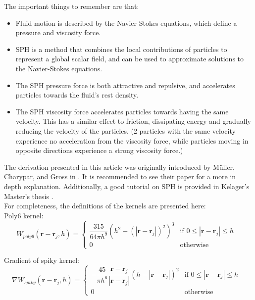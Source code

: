 \documentclass[]{article}
\begin{document}
	The important things to remember are that: 
	\begin{itemize}
		\item Fluid motion is described by the Navier-Stokes equations, which define a pressure and viscosity force.
		\item SPH is a method that combines the local contributions of particles to represent a global scalar field, 
		and can be used to approximate solutions to the Navier-Stokes equations.
		\item The SPH pressure force is both attractive and repulsive, and accelerates particles towards the fluid's 
		rest density.
		\item The SPH viscosity force accelerates particles towards having the same velocity. This has a similar effect
		to friction, dissipating energy and gradually reducing the velocity of the particles. (2 particles with the 
		same velocity experience no acceleration from the viscosity force, while particles moving in opposite directions 
		experience a strong viscosity force.)
	\end{itemize}
	
	The derivation presented in this article was originally introduced by M\"{u}ller, Charypar, and Gross in 
	\cite{Muller:2003:PFS:846276.846298}. It is recommended to see their paper for a more in depth explanation. 
	Additionally, a good tutorial on SPH is provided in Kelager's Master's thesis \cite{MK:2006}.\\
	
	For completeness, the definitions of the kernels are presented here:\\
	
	Poly6 kernel:
	\begin{equation}
		W_{poly6}(\mathbf{r} - \mathbf{r}_j, h) = 
			\left \{ 
				\begin{array}{ll}
					\dfrac{315}{64 \pi h^9 } (h^2 - (|\mathbf{r} - \mathbf{r}_j|)^2)^3 
						& \textrm{if \(0 \leq |\mathbf{r} - \mathbf{r}_j| \leq h\) } \\[1em]
					0 & \textrm{otherwise} 
				\end{array}
			\right.
	\end{equation}
	
	Gradient of spiky kernel:
	\begin{equation}
		\nabla W_{spiky}(\mathbf{r} - \mathbf{r}_j, h) =  
				\left \{ 
					\begin{array}{ll}
						- \dfrac{45}{\pi h^6}  \dfrac{\mathbf{r} - \mathbf{r}_j}{|\mathbf{r} - \mathbf{r}_j|} 
							(h - |\mathbf{r} - \mathbf{r}_j|)^2 
							& \textrm{if \(0 \leq |\mathbf{r} - \mathbf{r}_j| \leq h\) } \\[1em]
						0 & \textrm{otherwise} 
					\end{array}
				\right.
	\end{equation}
	
\end{document}

